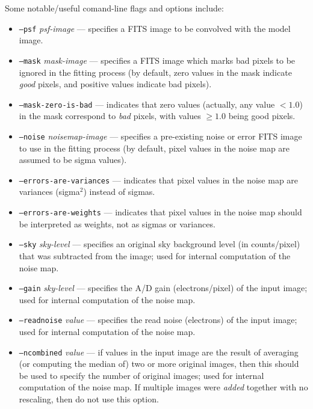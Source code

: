 \documentclass[10pt]{article}
\begin{document}
Some notable/useful comand-line flags and options include:
\begin{itemize}
\item \texttt{--psf} \textit{psf-image} --- specifies a FITS image to be convolved
with the model image.

\bigskip

\item \texttt{--mask} \textit{mask-image} --- specifies a FITS image which marks
bad pixels to be ignored in the fitting process (by default, zero values in
the mask indicate \textit{good} pixels, and positive values indicate bad pixels).
\item \texttt{--mask-zero-is-bad} --- indicates that zero values (actually,
any value $< 1.0$) in the mask correspond to \textit{bad} pixels, with values
$\geq 1.0$ being good pixels.

\bigskip

\item \texttt{--noise} \textit{noisemap-image} --- specifies a pre-existing noise
or error FITS image to use in the fitting process (by default, pixel values in the
noise map are assumed to be sigma values).
\item \texttt{--errors-are-variances} --- indicates that pixel values in the noise
map are variances (sigma$^2$) instead of sigmas.
\item \texttt{--errors-are-weights} --- indicates that pixel values in the noise
map should be interpreted as weights, not as sigmas or variances.

\bigskip

\item \texttt{--sky} \textit{sky-level} --- specifies an original sky background
level (in counts/pixel) that was subtracted from the image; used for internal
computation of the noise map.
\item \texttt{--gain} \textit{sky-level} --- specifies the A/D gain (electrons/pixel)
of the input image; used for internal computation of the noise map.
\item \texttt{--readnoise} \textit{value} --- specifies the read noise (electrons)
of the input image; used for internal computation of the noise map.
\item \texttt{--ncombined} \textit{value} --- if values in the input image are the
result of averaging (or computing the median of) two or more original images, then
this should be used to specify the number of original images; used for internal 
computation of the noise map.  If multiple images were \textit{added} together
with no rescaling, then do not use this option.


\end{itemize}
\end{document}

